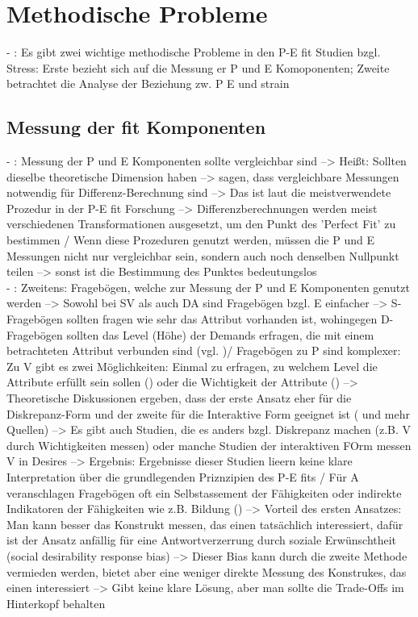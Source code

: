 \section{Methodische Probleme}
\label{ch:notizen:methodischeProbleme}
- \cite[S. 7]{edwards:1990}: Es gibt zwei wichtige methodische Probleme in den P-E fit Studien bzgl. Stress: Erste bezieht sich auf die Messung er P und E Komoponenten; Zweite betrachtet die Analyse der Beziehung zw. P E und strain

\subsection{Messung der fit Komponenten}
\label{ch:notizen:methodischeProbleme:messungDerFitKomponenten}
- \cite[S. 8]{edwards:1990}: Messung der P und E Komponenten sollte vergleichbar sind --> Heißt: Sollten dieselbe theoretische Dimension haben --> \textcite{copingAndAdaption:1974} sagen, dass vergleichbare Messungen notwendig für Differenz-Berechnung sind --> Das ist laut \textcite{jobDemandsAndWorkerHealth:1975} die meistverwendete Prozedur in der P-E fit Forschung --> Differenzberechnungen werden meist verschiedenen Transformationen ausgesetzt, um den Punkt des 'Perfect Fit' zu bestimmen \textcite{jobDemandsAndWorkerHealth:1975} / Wenn diese Prozeduren genutzt werden, müssen die P und E Messungen nicht nur vergleichbar sein, sondern auch noch denselben Nullpunkt teilen --> sonst ist die Bestimmung des Punktes bedeutungslos \\
- \cite[S. 8]{edwards:1990}: Zweitens: Fragebögen, welche zur Messung der P und E Komponenten genutzt werden --> Sowohl bei SV als auch DA sind Fragebögen bzgl. E einfacher --> S-Fragebögen sollten fragen wie sehr das Attribut vorhanden ist, wohingegen D-Fragebögen sollten das Level (Höhe) der Demands erfragen, die mit einem betrachteten Attribut verbunden sind (vgl. \textcite{jobDemandsAndWorkerHealth:1975})/ Fragebögen zu P sind komplexer: Zu V gibt es zwei Möglichkeiten: Einmal zu erfragen, zu welchem Level die Attribute erfüllt sein sollen (\textcite{jobDemandsAndWorkerHealth:1975}) oder die Wichtigkeit der Attribute (\textcite{workAdjustment:1964}) --> Theoretische Diskussionen ergeben, dass der erste Ansatz eher für die Diskrepanz-Form und der zweite für die Interaktive Form geeignet ist (\textcite{copingAndAdaption:1974} und mehr Quellen) --> Es gibt auch Studien, die es anders bzgl. Diskrepanz machen (z.B. V durch Wichtigkeiten messen) oder manche Studien der interaktiven FOrm messen V in Desires --> Ergebnis: Ergebnisse dieser Studien lieern keine klare Interpretation über die grundlegenden Priznzipien des P-E fits / Für A veranschlagen Fragebögen oft ein Selbstassement der Fähigkeiten  oder indirekte Indikatoren der Fähigkeiten wie z.B. Bildung (\textcite{jobDemandsAndWorkerHealth:1975}) --> Vorteil des ersten Ansatzes: Man kann besser das Konstrukt messen, das einen tatsächlich interessiert, dafür ist der Ansatz anfällig für eine Antwortverzerrung durch soziale Erwünschtheit (social desirability response bias) --> Dieser Bias kann durch die zweite Methode vermieden werden, bietet aber eine weniger direkte Messung des Konstrukes, das einen interessiert --> Gibt keine klare Lösung, aber man sollte die Trade-Offs im Hinterkopf behalten \\
